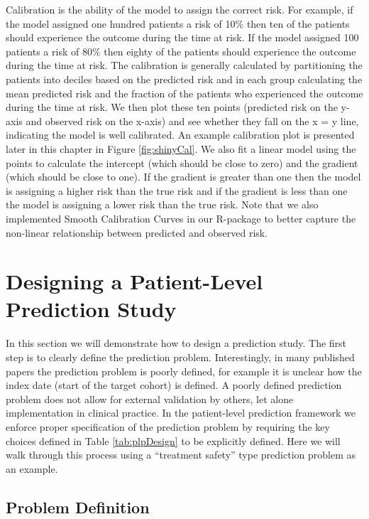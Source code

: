 \documentclass[11pt]{book}
\theoremstyle{definition}
\theoremstyle{definition}
\theoremstyle{definition}
\theoremstyle{remark}
\begin{document}
Calibration is the ability of the model to assign the correct risk. For
example, if the model assigned one hundred patients a risk of 10\% then
ten of the patients should experience the outcome during the time at
risk. If the model assigned 100 patients a risk of 80\% then eighty of
the patients should experience the outcome during the time at risk. The
calibration is generally calculated by partitioning the patients into
deciles based on the predicted risk and in each group calculating the
mean predicted risk and the fraction of the patients who experienced the
outcome during the time at risk. We then plot these ten points
(predicted risk on the y-axis and observed risk on the x-axis) and see
whether they fall on the x = y line, indicating the model is well
calibrated. An example calibration plot is presented later in this
chapter in Figure \ref{fig:shinyCal}. We also fit a linear model using
the points to calculate the intercept (which should be close to zero)
and the gradient (which should be close to one). If the gradient is
greater than one then the model is assigning a higher risk than the true
risk and if the gradient is less than one the model is assigning a lower
risk than the true risk. Note that we also implemented Smooth
Calibration Curves in our R-package to better capture the non-linear
relationship between predicted and observed risk. 

\section{Designing a Patient-Level Prediction
Study}\label{designing-a-patient-level-prediction-study}

In this section we will demonstrate how to design a prediction study.
The first step is to clearly define the prediction problem.
Interestingly, in many published papers the prediction problem is poorly
defined, for example it is unclear how the index date (start of the
target cohort) is defined. A poorly defined prediction problem does not
allow for external validation by others, let alone implementation in
clinical practice. In the patient-level prediction framework we enforce
proper specification of the prediction problem by requiring the key
choices defined in Table \ref{tab:plpDesign} to be explicitly defined.
Here we will walk through this process using a ``treatment safety'' type
prediction problem as an example. 

\subsection{Problem Definition}\label{problem-definition-3}
\end{document}
